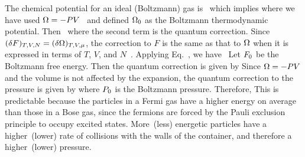{	The chemical potential for an ideal (Boltzmann) gas is~\cite[pp.~127, 151]{Landau}
	which implies
	where we have used $\Omega = -P V$~\cite[p.~69]{Landau} and defined $\Omega_0$ as the Boltzmann thermodynamic potential.  Then~\cite[p.~151]{Landau}
	where the second term is the quantum correction.  Since $(\delta F)_{T, V, N} = (\delta \Omega)_{T, V, \mu}$, the correction to $F$ is the same as that to $\Omega$ when it is expressed in terms of $T$, $V$, and $N$~\cite[pp.~69, 151]{Landau}.  Applying Eq.~, we have~\cite[p.~151]{Landau}
	Let $F_0$ be the Boltzmann free energy.  Then the quantum correction is given by
	Since $\Omega = -P V$ and the volume is not affected by the expansion, the quantum correction to the pressure is given by
	where $P_0$ is the Boltzmann pressure.  Therefore,  This is predictable because the particles in a Fermi gas have a higher energy on average than those in a Bose gas, since the fermions are forced by the Pauli exclusion principle to occupy excited states.  More~(less) energetic particles have a higher~(lower) rate of collisions with the walls of the container, and therefore a higher~(lower) pressure.
}